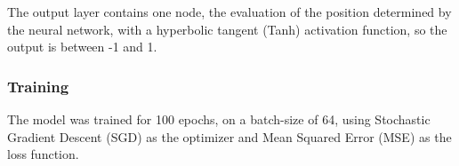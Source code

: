 The output layer contains one node, the evaluation of the position determined by the neural network, with a hyperbolic tangent (Tanh) activation function, so the output is between -1 and 1.

\subsubsection{Training}
\label{subsec:ch4sec3subsec2subsubsec3}


The model was trained for 100 epochs, on a batch-size of 64, using Stochastic Gradient Descent (SGD) as the optimizer and Mean Squared Error (MSE) as the loss function.